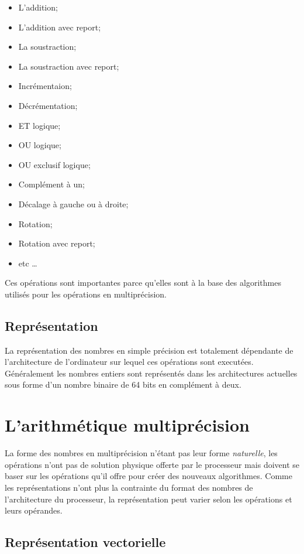 \documentclass[letterpaper]{article}
\begin{document}
\begin{itemize}
  \item L'addition;
  \item L'addition avec report;
  \item La soustraction;
  \item La soustraction avec report;
  \item Incrémentaion;
  \item Décrémentation;
  \item ET logique;
  \item OU logique;
  \item OU exclusif logique;
  \item Complément à un;
  \item Décalage à gauche ou à droite;
  \item Rotation;
  \item Rotation avec report;
  \item etc \dots
\end{itemize}

Ces opérations sont importantes parce qu'elles sont à la base des algorithmes
utilisés pour les opérations en multiprécision.

\subsection{Représentation}

La représentation des nombres en simple précision est totalement dépendante de
l'architecture de l'ordinateur sur lequel ces opérations sont executées.
Généralement les nombres entiers sont représentés dans les architectures
actuelles sous forme d'un nombre binaire de 64 bits en complément à deux.

\section{L'arithmétique multiprécision}

La forme des nombres en multiprécision n'étant pas leur forme
\emph{naturelle}, les opérations n'ont pas de solution physique offerte
par le processeur mais doivent se baser sur les opérations qu'il offre pour créer
des nouveaux algorithmes. Comme les représentations n'ont plus la contrainte
du format des nombres de l'architecture du processeur, la représentation peut
varier selon les opérations et leurs opérandes.

\subsection{Représentation vectorielle}
\end{document}
